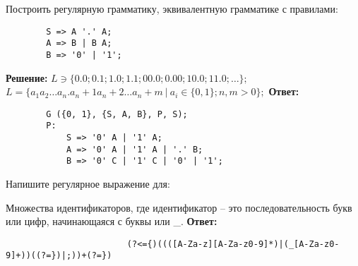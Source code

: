\documentclass[]{article}
\begin{document}
\begin{enumerate}
\begin{item}
    Построить регулярную грамматику, эквивалентную грамматике с правилами:
    \begin{lstlisting}
        S => A '.' A;
        A => B | B A;
        B => '0' | '1';
    \end{lstlisting}

    \textbf{Решение:}
    \smallbreak
    $L \ni \{ 0.0; 0.1; 1.0; 1.1; 00.0; 0.00; 10.0; 11.0; \dots \};$
    \hfill\break$L = \{ a_1 a_2 \dots a_n . a_n+1 a_n+2 \dots a_n+m \ |\  a_i \in \{ 0, 1 \}; n, m > 0 \};$
    \bigbreak
    \textbf{Ответ:}
    \begin{lstlisting}
        G ({0, 1}, {S, A, B}, P, S);
        P:
            S => '0' A | '1' A;
            A => '0' A | '1' A | '.' B;
            B => '0' C | '1' C | '0' | '1';
    \end{lstlisting}
\end{item}

\begin{item}
    Напишите регулярное выражение для:
    \begin{enumerate}

        \begin{item}
            Множества идентификаторов, где идентификатор – это последовательность букв или цифр, начинающаяся с буквы или \_.
            \bigbreak
            \textbf{Ответ:}
            \begin{enumerate}

                \begin{item}
                    \begin{lstlisting}
                        (?<={)((([A-Za-z][A-Za-z0-9]*)|(_[A-Za-z0-9]+))((?=})|;))+(?=})
                    \end{lstlisting}
                \end{item}


\end{enumerate}
\end{item}
\end{enumerate}
\end{item}
\end{enumerate}
\end{document}
